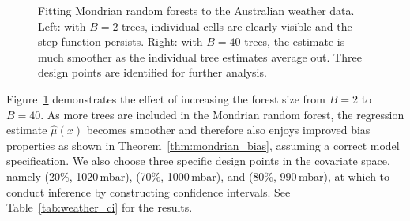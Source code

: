 \begin{figure}[t]
\begin{subfigure}{0.49\textwidth}
  \end{subfigure}
  \caption[Fitting Mondrian random forests to the Australian weather data]{
    Fitting Mondrian random forests to the Australian weather data.
    Left: with $B=2$ trees, individual cells are clearly visible and the step
    function persists. Right: with $B=40$ trees, the estimate is much smoother
    as the individual tree estimates average out.
  Three design points are identified for further analysis.}
  \label{fig:weather_forest}
\end{figure}

Figure~\ref{fig:weather_forest}
demonstrates the effect of increasing the forest size from $B=2$ to $B=40$.
As more trees are included in the Mondrian random forest,
the regression estimate $\hat \mu(x)$ becomes smoother and therefore also
enjoys improved bias properties as shown in
Theorem~\ref{thm:mondrian_bias}, assuming a correct model specification.
We also choose three specific design points in the covariate space,
namely (20\%, 1020\,mbar), (70\%, 1000\,mbar), and (80\%, 990\,mbar),
at which to conduct inference
by constructing confidence intervals. See Table~\ref{tab:weather_ci}
for the results.


